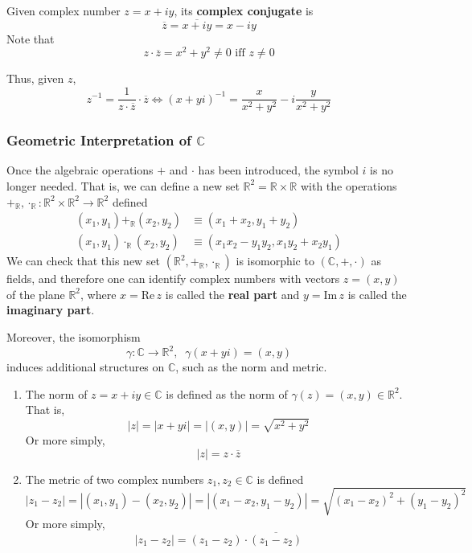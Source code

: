 \documentclass{article}
\begin{document}
  \begin{definition}
    Given complex number $z = x + i y$, its \textbf{complex conjugate} is 
    \[\overline{z} = \overline{x + iy} = x - iy\]
    Note that 
    \[z \cdot \overline{z} = x^2 + y^2 \neq 0 \text{ iff } z \neq 0\]
  \end{definition}

  Thus, given $z$, 
  \[z^{-1} = \frac{1}{z \cdot \overline{z}} \cdot \overline{z} \iff (x + yi)^{-1} = \frac{x}{x^2 + y^2} - i \frac{y}{x^2 + y^2}\]

  \subsubsection[Geometric Interpretation of C]{Geometric Interpretation of $\mathbb{C}$}
  Once the algebraic operations $+$ and $\cdot$ has been introduced, the symbol $i$ is no longer needed. That is, we can define a new set $\mathbb{R}^2 = \mathbb{R} \times \mathbb{R}$ with the operations $+_\mathbb{R}, \cdot_\mathbb{R} : \mathbb{R}^2 \times \mathbb{R}^2 \longrightarrow \mathbb{R}^2$ defined
  \begin{align*}
      (x_1, y_1) +_\mathbb{R} (x_2, y_2) & \equiv (x_1 + x_2, y_1 + y_2) \\
      (x_1, y_1) \cdot_\mathbb{R} (x_2, y_2) & \equiv (x_1 x_2 - y_1 y_2, x_1 y_2 + x_2 y_1)
  \end{align*}
  We can check that this new set $(\mathbb{R}^2, +_\mathbb{R}, \cdot_{\mathbb{R}})$ is isomorphic to $(\mathbb{C}, +, \cdot)$ as fields, and therefore one can identify complex numbers with vectors $z = (x, y)$ of the plane $\mathbb{R}^2$, where $x = \text{Re}\,z$ is called the \textbf{real part} and $y = \text{Im}\,z$ is called the \textbf{imaginary part}. 

  \begin{definition}
    Moreover, the isomorphism
    \[\gamma: \mathbb{C} \longrightarrow \mathbb{R}^2, \;\; \gamma(x + yi) = (x, y)\]
    induces additional structures on $\mathbb{C}$, such as the norm and metric. 
    \begin{enumerate}
      \item The norm of $z = x + iy \in \mathbb{C}$ is defined as the norm of $\gamma(z) = (x, y) \in \mathbb{R}^2$. That is, 
      \[|z| = |x + yi| = |(x, y)| = \sqrt{x^2 + y^2}\]
      Or more simply, 
      \[|z| = z \cdot \overline{z}\]
      \item The metric of two complex numbers $z_1, z_2 \in \mathbb{C}$ is defined
      \[|z_1 - z_2| = |(x_1, y_1) - (x_2, y_2)| = |(x_1 - x_2, y_1 - y_2)| = \sqrt{(x_1 - x_2)^2 + (y_1 - y_2)^2}\]
      Or more simply, 
      \[|z_1 - z_2| = (z_1 - z_2) \cdot \overline{(z_1 - z_2)}\]
    \end{enumerate}
  \end{definition}
\end{document}
